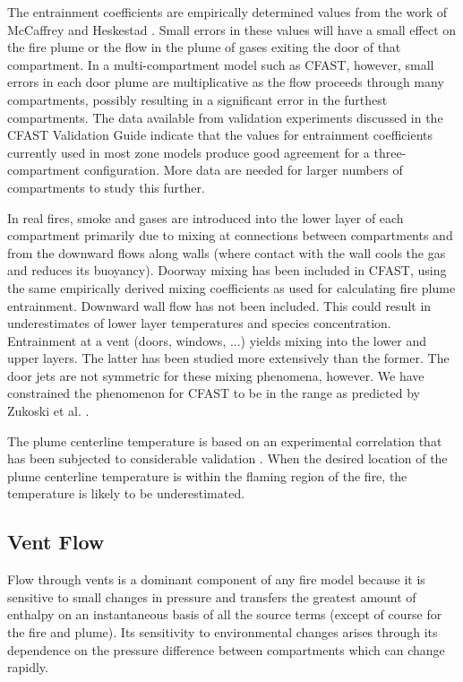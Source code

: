 The entrainment coefficients are empirically determined values from the work of McCaffrey \cite{McCaffrey:1983} and Heskestad \cite{Heskestad:1984}. Small errors in these values will have a small effect on the fire plume or the flow in the plume of gases exiting the door of that compartment.  In a multi-compartment model such as CFAST, however, small errors in each door plume are multiplicative as the flow proceeds through many compartments, possibly resulting in a significant error in the furthest compartments.  The data available from validation experiments \cite{Peacock:1988} discussed in the CFAST Validation Guide \cite{CFAST_Valid_Guide_6} indicate that the values for entrainment coefficients currently used in most zone models produce good agreement for a three-compartment configuration.  More data are needed for larger numbers of compartments to study this further.

In real fires, smoke and gases are introduced into the lower layer of each compartment primarily
due to mixing at connections between compartments and from the downward flows along walls
(where contact with the wall cools the gas and reduces its buoyancy).  Doorway mixing has been
included in CFAST, using the same empirically derived mixing coefficients as used for
calculating fire plume entrainment. Downward wall flow has not been included. This could
result in underestimates of lower layer temperatures and species concentration.
Entrainment at a vent (doors, windows, ...) yields mixing into the lower and upper layers. The
latter has been studied more extensively than the former. The door jets are not symmetric for
these mixing phenomena, however.  We have constrained the phenomenon for CFAST to be in
the range as predicted by Zukoski et al. \cite{Zukoski:1985}.

The plume centerline temperature is based on an experimental correlation that has been subjected to considerable validation \cite{Valid:Davis_Plumes}. When the desired location of the plume centerline temperature is within the flaming region of the fire, the temperature is likely to be underestimated.

\subsection{Vent Flow}

Flow through vents is a dominant component of any fire model because it is sensitive to small changes in pressure and transfers the greatest amount of enthalpy on an instantaneous basis of all the source terms (except of course for the fire and plume).  Its sensitivity to environmental changes arises through its dependence on the pressure difference between compartments which can change rapidly.

